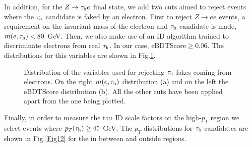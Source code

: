 In addition, for the $Z\to\tau_\text{h} e$ final state, we add two cuts aimed to reject events where the $\tau_\text{h}$ candidate is faked by an electron. First to reject $Z\to ee$ events, a requirement on the invariant mass of the electron and $\tau_\text{h}$ candidate is made, $m(e,\tau_\text{h})<80$ GeV. Then, we also make use of an ID algorithm trained to discriminate electrons from real $\tau_\text{h}$. In our case, eBDTScore$\geq 0.06$. The distributions for this variables are shown in Fig.\ref{Fig11}.
\begin{figure}[ht]
	\centering
	\hfill
	\caption{Distribution of the variables used for rejecting $\tau_\text{h}$ fakes coming from electrons. On the right $m(e,\tau_\text{h})$ distribution (a) and on the left the eBDTScore distribution (b). All the other cuts have been applied apart from the one being plotted.}
	\label{Fig11}
\end{figure}
Finally, in order to measure the tau ID scale factors on the high-$p_T$ region we select events where $p_T(\tau_\text{h})\geq 45$ GeV. The $p_T$ distributions for $\tau_\text{h}$ candidates are shown in Fig.\ref{Fig12} for the in between and outside regions.
